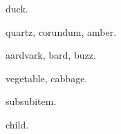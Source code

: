 \documentclass{article}
\begin{document}
\gls{duck}.

\gls{quartz}, \gls{corundum}, \gls{amber}.

\gls{aardvark}, \gls{bard}, \gls{buzz}.

\gls{vegetable}, \gls{cabbage}.

\gls{subsubitem}.

\gls{child}.

\printunsrtglossaries
\end{document}
